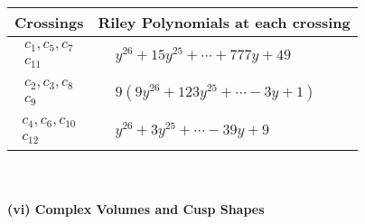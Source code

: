 \documentclass[1p]{elsarticle_modified}
\theoremstyle{definition}
\begin{document}
\begin{tabular}{m{50pt}|m{274pt}}
Crossings & \hspace{64pt}Riley Polynomials at each crossing \\
\hline $$\begin{aligned}c_{1},c_{5},c_{7}\\c_{11}\end{aligned}$$&$\begin{aligned}
&y^{26}+15 y^{25}+\cdots+777 y+49
\end{aligned}$\\
\hline $$\begin{aligned}c_{2},c_{3},c_{8}\\c_{9}\end{aligned}$$&$\begin{aligned}
&9(9 y^{26}+123 y^{25}+\cdots-3 y+1)
\end{aligned}$\\
\hline $$\begin{aligned}c_{4},c_{6},c_{10}\\c_{12}\end{aligned}$$&$\begin{aligned}
&y^{26}+3 y^{25}+\cdots-39 y+9
\end{aligned}$\\
\hline
\end{tabular}\\~\\
\newpage\flushleft \textbf{(vi) Complex Volumes and Cusp Shapes}
\end{document}
